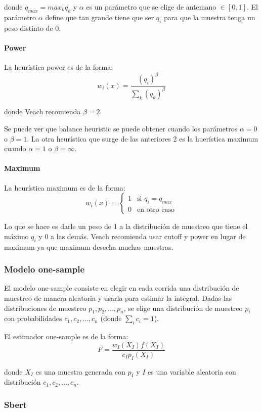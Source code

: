 \documentclass{article}
\begin{document}
donde $q_{max} = max_{k} q_{k}$ y $\alpha$ es un parámetro que se elige de antemano $\in [0, 1]$.
El parámetro $\alpha$ define que tan grande tiene que ser $q_{i}$ para que la muestra tenga un peso distinto de 0.

\paragraph{Power} La heurística power es de la forma:
$$ w_{i}(x) = \frac{(q_{i})^{\beta}}{\sum_{k} (q_{k})^{\beta}}$$

donde Veach recomienda $\beta = 2$.

Se puede ver que balance heuristic se puede obtener cuando los parámetros $\alpha = 0$ o $\beta = 1$.
La otra heurística que surge de las anteriores 2 es la huerística maximum cuando $\alpha = 1$ o $\beta = \infty$.

\paragraph{Maximum} La heurística maximum es de la forma:
$$ w_{i}(x) = \begin{cases} 1 & \text{si } q_{i} = q_{max} \\ 0 & \text{en otro caso} \end{cases}$$

Lo que se hace es darle un peso de 1 a la distribución de muestreo que tiene el máximo $q_{i}$ y 0 a las demás.
Veach recomienda usar cutoff y power en lugar de maximum ya que maximum desecha muchas muestras.

\subsubsection{Modelo one-sample}

El modelo one-sample consiste en elegir en cada corrida una distribución de muestreo de manera aleatoria y usarla para estimar la integral.
Dadas las distribuciones de muestreo $p_{1}, p_{2}, ..., p_{n}$, se elige una distribución de muestreo $p_{i}$ con probabilidades $c_{1}, c_{2}, ..., c_{n}$ (donde $\sum_{i} c_{i} = 1$).

El estimador one-sample es de la forma:
$$F = \frac{w_{I}(X_{I}) f(X_{I})}{c_{I} p_{I}(X_{I})}$$

donde $X_{I}$ es una muestra generada con $p_{I}$ y $I$ es una variable aleatoria con distribución $c_{1}, c_{2}, ..., c_{n}$.

\subsubsection{Sbert}
\end{document}
